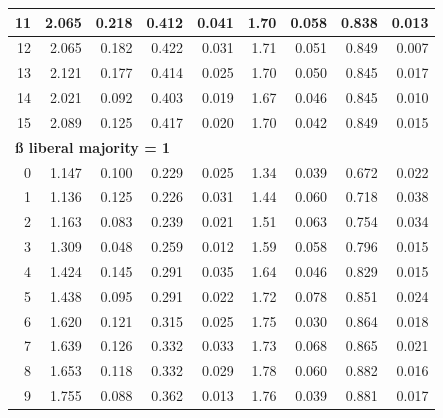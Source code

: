 \documentclass[
]{article}
\begin{document}
\begin{table}
\begin{tabular}[t]{r|r|r|r|r|r|r|r|r}
\hline
\hspace{1em}11 & 2.065 & 0.218 & 0.412 & 0.041 & 1.70 & 0.058 & 0.838 & 0.013\\
\hline
\hspace{1em}12 & 2.065 & 0.182 & 0.422 & 0.031 & 1.71 & 0.051 & 0.849 & 0.007\\
\hline
\hspace{1em}13 & 2.121 & 0.177 & 0.414 & 0.025 & 1.70 & 0.050 & 0.845 & 0.017\\
\hline
\hspace{1em}14 & 2.021 & 0.092 & 0.403 & 0.019 & 1.67 & 0.046 & 0.845 & 0.010\\
\hline
\hspace{1em}15 & 2.089 & 0.125 & 0.417 & 0.020 & 1.70 & 0.042 & 0.849 & 0.015\\
\hline
\multicolumn{9}{l}{\textbf{ß liberal majority = 1}}\\
\hline
\hspace{1em}0 & 1.147 & 0.100 & 0.229 & 0.025 & 1.34 & 0.039 & 0.672 & 0.022\\
\hline
\hspace{1em}1 & 1.136 & 0.125 & 0.226 & 0.031 & 1.44 & 0.060 & 0.718 & 0.038\\
\hline
\hspace{1em}2 & 1.163 & 0.083 & 0.239 & 0.021 & 1.51 & 0.063 & 0.754 & 0.034\\
\hline
\hspace{1em}3 & 1.309 & 0.048 & 0.259 & 0.012 & 1.59 & 0.058 & 0.796 & 0.015\\
\hline
\hspace{1em}4 & 1.424 & 0.145 & 0.291 & 0.035 & 1.64 & 0.046 & 0.829 & 0.015\\
\hline
\hspace{1em}5 & 1.438 & 0.095 & 0.291 & 0.022 & 1.72 & 0.078 & 0.851 & 0.024\\
\hline
\hspace{1em}6 & 1.620 & 0.121 & 0.315 & 0.025 & 1.75 & 0.030 & 0.864 & 0.018\\
\hline
\hspace{1em}7 & 1.639 & 0.126 & 0.332 & 0.033 & 1.73 & 0.068 & 0.865 & 0.021\\
\hline
\hspace{1em}8 & 1.653 & 0.118 & 0.332 & 0.029 & 1.78 & 0.060 & 0.882 & 0.016\\
\hline
\hspace{1em}9 & 1.755 & 0.088 & 0.362 & 0.013 & 1.76 & 0.039 & 0.881 & 0.017\\
\hline

\end{tabular}
\end{table}
\end{document}
